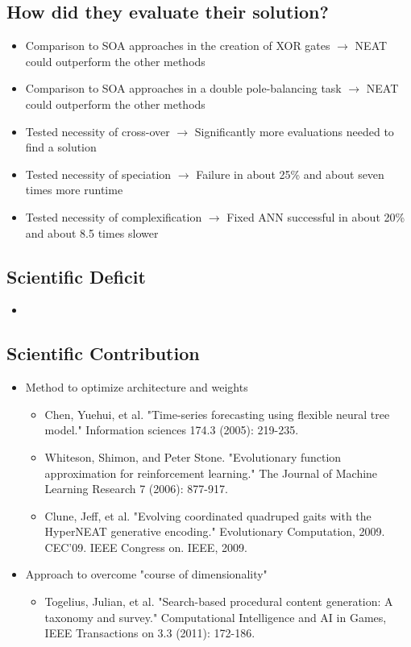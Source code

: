 \documentclass[paper=a4, fontsize=11pt]{scrartcl} %
\numberwithin{equation}{section} %
\numberwithin{figure}{section} %
\numberwithin{table}{section} %
\begin{document}
\subsection{How did they evaluate their solution?}
\begin{itemize}
	\item Comparison to SOA approaches in the creation of XOR gates $\rightarrow$ NEAT could outperform the other methods
	\item Comparison to SOA approaches in a double pole-balancing task $\rightarrow$ NEAT could outperform the other methods
	\item Tested necessity of cross-over $\rightarrow$ Significantly more evaluations needed to find a solution
	\item Tested necessity of speciation $\rightarrow$ Failure in about 25\% and about seven times more runtime
	\item Tested necessity of complexification $\rightarrow$ Fixed ANN successful in about 20\% and about 8.5 times slower
\end{itemize}

\subsection{Scientific Deficit}
\begin{itemize}
	\item 
\end{itemize}

\subsection{Scientific Contribution}
\begin{itemize}
	\item Method to optimize architecture and weights
	\begin{itemize}
		\item Chen, Yuehui, et al. "Time-series forecasting using flexible neural tree model." Information sciences 174.3 (2005): 219-235.
		\item Whiteson, Shimon, and Peter Stone. "Evolutionary function approximation for reinforcement learning." The Journal of Machine Learning Research 7 (2006): 877-917.
		\item Clune, Jeff, et al. "Evolving coordinated quadruped gaits with the HyperNEAT generative encoding." Evolutionary Computation, 2009. CEC'09. IEEE Congress on. IEEE, 2009.
	\end{itemize}
	\item Approach to overcome "course of dimensionality"
	\begin{itemize}
		\item Togelius, Julian, et al. "Search-based procedural content generation: A taxonomy and survey." Computational Intelligence and AI in Games, IEEE Transactions on 3.3 (2011): 172-186.
	\end{itemize}
\end{itemize}
\end{document}

